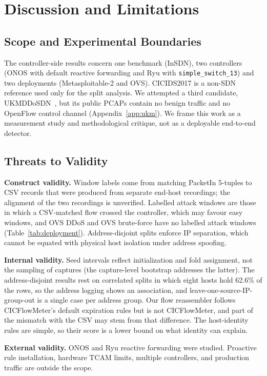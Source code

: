\documentclass[journal]{IEEEtran}
\begin{document}
\section{Discussion and Limitations}\label{sec:discussion}
\subsection{Scope and Experimental Boundaries}
The controller-side results concern one benchmark (InSDN), two controllers (ONOS with default reactive forwarding and Ryu with \texttt{simple\_switch\_13}) and two deployments (Metasploitable-2 and OVS). CICIDS2017 is a non-SDN reference used only for the split analysis. We attempted a third candidate, UKMDDoSDN~\cite{ukmddosdn2025}, but its public PCAPs contain no benign traffic and no OpenFlow control channel (Appendix~\ref{app:ukm}). We frame this work as a measurement study and methodological critique, not as a deployable end-to-end detector.

\subsection{Threats to Validity}
\textbf{Construct validity.} Window labels come from matching PacketIn 5-tuples to CSV records that were produced from separate end-host recordings; the alignment of the two recordings is unverified. Labelled attack windows are those in which a CSV-matched flow crossed the controller, which may favour easy windows, and OVS DDoS and OVS brute-force have no labelled attack windows (Table~\ref{tab:deployment}). Address-disjoint splits enforce IP separation, which cannot be equated with physical host isolation under address spoofing.

\textbf{Internal validity.} Seed intervals reflect initialization and fold assignment, not the sampling of captures (the capture-level bootstrap addresses the latter). The address-disjoint results rest on correlated splits in which eight hosts hold 62.6\% of the rows, so the address logging shows an association, and leave-one-source-IP-group-out is a single case per address group. Our flow reassembler follows CICFlowMeter's default expiration rules but is not CICFlowMeter, and part of the mismatch with the CSV may stem from that difference. The host-identity rules are simple, so their score is a lower bound on what identity can explain.

\textbf{External validity.} ONOS and Ryu reactive forwarding were studied. Proactive rule installation, hardware TCAM limits, multiple controllers, and production traffic are outside the scope.
\end{document}
